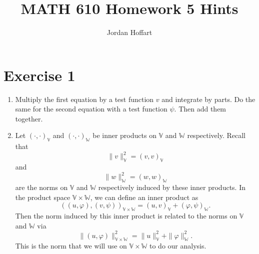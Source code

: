 \documentclass{article}
\title{MATH 610 Homework 5 Hints}
\author{Jordan Hoffart}
\date{}
\theoremstyle{plain}
\theoremstyle{definition}
\theoremstyle{remark}
\begin{document}
\maketitle

\section*{Exercise 1}
\begin{enumerate}
	\item  Multiply the first equation by a test function $v$ and integrate by parts.
	      Do the same for the second equation with a test function $\psi$.
	      Then add them together.
	\item Let $(\cdot,\cdot)_{\mathbb V}$ and $(\cdot,\cdot)_{\mathbb W}$ be inner products on $\mathbb V$ and $\mathbb W$ respectively.
	      Recall that \[\|v\|_{\mathbb V}^2 = (v,v)_{\mathbb V}\] and \[\|w\|_{\mathbb W}^2 = (w,w)_{\mathbb W}\] are the norms on $\mathbb V$ and $\mathbb W$ respectively induced by these inner products.
	      In the product space $\mathbb V \times \mathbb W$, we can define an inner product as \[((u,\varphi),(v,\psi))_{\mathbb V \times \mathbb W} = (u,v)_{\mathbb V} + (\varphi,\psi)_{\mathbb W}.\]
	      Then the norm induced by this inner product is related to the norms on $\mathbb V$ and $\mathbb W$ via
	      \[\|(u,\varphi)\|_{\mathbb V \times \mathbb W}^2 = \|u\|_{\mathbb V}^2 + \|\varphi\|_{\mathbb W}^2.\]
	      This is the norm that we will use on $\mathbb V \times \mathbb W$ to do our analysis.


\end{enumerate}
\end{document}
